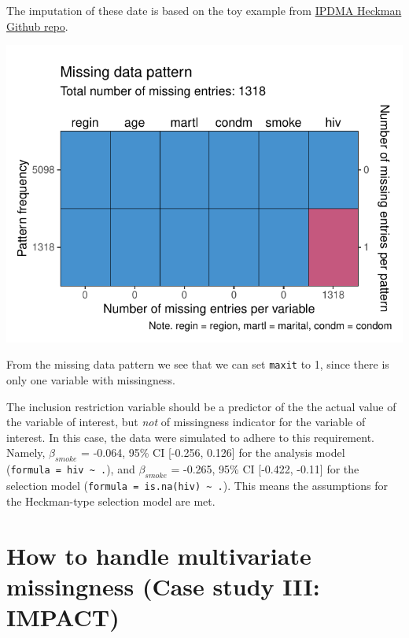 \documentclass[
]{jss}
\begin{document}
The imputation of these date is based on the toy example from
\href{https://github.com/johamunoz/Heckman-IPDMA/blob/main/Toy_example.R}{IPDMA
Heckman Github repo}.

\begin{CodeChunk}


\begin{center}\includegraphics{Imputation_of_Incomplete_Multilevel_Data_files/figure-latex/hiv-1} \end{center}

\end{CodeChunk}

From the missing data pattern we see that we can set \texttt{maxit} to
1, since there is only one variable with missingness.

The inclusion restriction variable should be a predictor of the the
actual value of the variable of interest, but \emph{not} of missingness
indicator for the variable of interest. In this case, the data were
simulated to adhere to this requirement. Namely, \(\beta_{smoke}\) =
-0.064, 95\% CI {[}-0.256, 0.126{]} for the analysis model
(\texttt{formula\ =\ hiv\ \textasciitilde{}\ .}), and \(\beta_{smoke}\)
= -0.265, 95\% CI {[}-0.422, -0.11{]} for the selection model
(\texttt{formula\ =\ is.na(hiv)\ \textasciitilde{}\ .}). This means the
assumptions for the Heckman-type selection model are met.

\hypertarget{how-to-handle-multivariate-missingness-case-study-iii-impact}{%
\section{How to handle multivariate missingness (Case study III:
IMPACT)}\label{how-to-handle-multivariate-missingness-case-study-iii-impact}}
\end{document}
